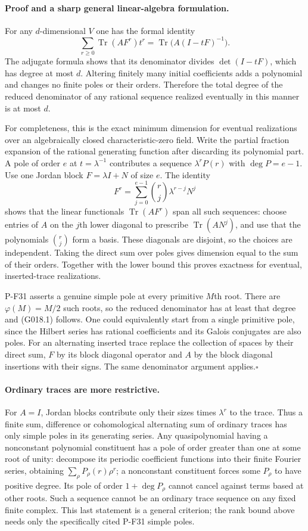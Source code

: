 \paragraph{Proof and a sharp general linear-algebra formulation.}
For any $d$-dimensional $V$ one has the formal identity
\[
\sum_{r\ge0}\operatorname{Tr}(AF^r)t^r
=\operatorname{Tr}\bigl(A(I-tF)^{-1}\bigr).
\]
The adjugate formula shows that its denominator divides
$\det(I-tF)$, which has degree at most $d$. Altering finitely
many initial coefficients adds a polynomial and changes no
finite poles or their orders. Therefore the total degree of
the reduced denominator of any rational sequence realized
eventually in this manner is at most $d$.

For completeness, this is the exact minimum dimension for
eventual realizations over an algebraically closed
characteristic-zero field. Write the partial fraction expansion
of the rational generating function after discarding its
polynomial part. A pole of order $e$ at $t=\lambda^{-1}$
contributes a sequence $\lambda^rP(r)$ with $\deg P=e-1$.
Use one Jordan block $F=\lambda I+N$ of size $e$. The identity
\[
F^r=\sum_{j=0}^{e-1}\binom rj\lambda^{r-j}N^j
\]
shows that the linear functionals $\operatorname{Tr}(AF^r)$
span all such sequences: choose entries of $A$ on the $j$th
lower diagonal to prescribe $\operatorname{Tr}(AN^j)$, and
use that the polynomials $\binom rj$ form a basis. These
diagonals are disjoint, so the choices are independent.
Taking the direct sum over poles gives dimension equal to
the sum of their orders. Together with the lower bound this
proves exactness for eventual, inserted-trace realizations.

P-F31 asserts a genuine simple pole at every primitive
$M$th root. There are $\varphi(M)=M/2$ such roots, so the
reduced denominator has at least that degree and (G018.1)
follows. One could equivalently start from a single primitive
pole, since the Hilbert series has rational coefficients and
its Galois conjugates are also poles. For an alternating
inserted trace replace the collection of spaces by their
direct sum, $F$ by its block diagonal operator and $A$ by
the block diagonal insertions with their signs. The same
denominator argument applies.\hfill$\square$

\paragraph{Ordinary traces are more restrictive.}
For $A=I$, Jordan blocks contribute only their sizes times
$\lambda^r$ to the trace. Thus a finite sum, difference or
cohomological alternating sum of ordinary traces has only
simple poles in its generating series. Any quasipolynomial
having a nonconstant polynomial constituent has a pole of
order greater than one at some root of unity: decompose its
periodic coefficient functions into their finite Fourier
series, obtaining $\sum_\rho P_\rho(r)\rho^r$; a nonconstant
constituent forces some $P_\rho$ to have positive degree.
Its pole of order $1+\deg P_\rho$ cannot cancel against
terms based at other roots. Such a sequence cannot be an
ordinary trace sequence on any fixed finite complex.
This last statement is a general criterion; the rank bound
above needs only the specifically cited P-F31 simple poles.

